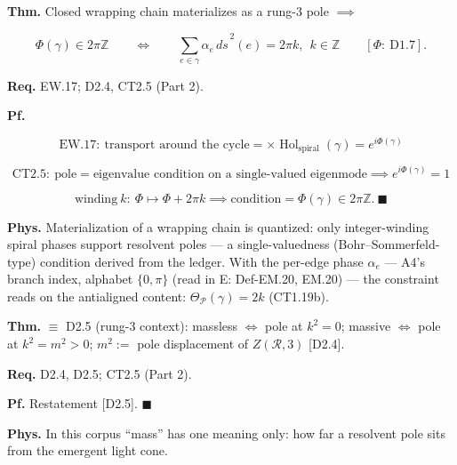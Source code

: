 \begin{theorem}\label{tag:EW-18}
\textbf{Thm.} Closed wrapping chain materializes as a rung-3 pole $\implies$

\[
\Phi(\gamma)\in2\pi\mathbb Z\qquad\iff\qquad\sum_{e\in\gamma}\alpha_e\,\widehat{ds}^{\,2}(e)=2\pi k,\ \ k\in\mathbb Z\qquad[\Phi:\ \mathrm{D1.7}].
\]

\textbf{Req.} EW.17; D2.4, CT2.5 (Part 2).

\textbf{Pf.}

\[
\mathrm{EW.17}:\ \text{transport around the cycle}=\times\operatorname{Hol}_{\mathrm{spiral}}(\gamma)=e^{i\Phi(\gamma)}
\]

\[
\mathrm{CT2.5}:\ \text{pole}=\text{eigenvalue condition on a single-valued eigenmode}\implies e^{i\Phi(\gamma)}=1
\]

\[
\text{winding}\ k:\ \Phi\mapsto\Phi+2\pi k\implies\text{condition}=\Phi(\gamma)\in2\pi\mathbb Z.\ \blacksquare
\]

\textbf{Phys.} Materialization of a wrapping chain is quantized: only integer-winding spiral phases support resolvent poles — a single-valuedness (Bohr–Sommerfeld-type) condition derived from the ledger. With the per-edge phase $\alpha_e$ — A4's branch index, alphabet $\{0,\pi\}$ (read in E: Def-EM.20, EM.20) — the constraint reads on the antialigned content: $\Theta_{\mathcal P}(\gamma)=2k$ (CT1.19b).

\end{theorem}

\begin{theorem}\label{tag:EW-19}
\textbf{Thm.} $\equiv$ D2.5 (rung-3 context): massless $\iff$ pole at $k^2=0$; massive $\iff$ pole at $k^2=m^2>0$; $m^2:=$ pole displacement of $Z(\mathcal R,3)$ [D2.4].

\textbf{Req.} D2.4, D2.5; CT2.5 (Part 2).

\textbf{Pf.} Restatement [D2.5]. $\blacksquare$

\textbf{Phys.} In this corpus “mass” has one meaning only: how far a resolvent pole sits from the emergent light cone.

\end{theorem}

